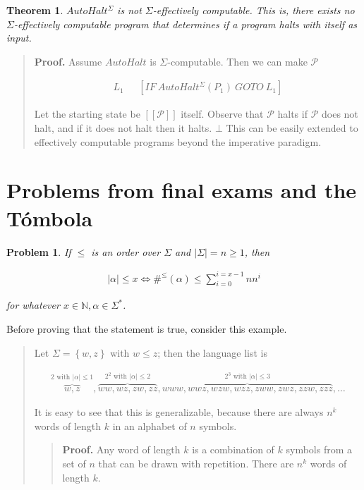 \documentclass[a4paper, 12pt]{article}
\newtheorem{problem}{Problem}
\newtheorem{theorem}{Theorem}
\newtheorem{problem}{Problem}
\newtheorem{theorem}{Theorem}
\begin{document}
\begin{theorem}
    $AutoHalt^{\Sigma}$ is not $\Sigma$-effectively computable. This is, there
    exists no $\Sigma$-effectively computable program that determines if a
    program halts with itself as input.
\end{theorem}


\small
\begin{quote}

    \textbf{Proof.} Assume $AutoHalt$ is $\Sigma$-computable. Then we can make
    $\mathcal{P}$

    \begin{align*}
        L_1 ~ ~ ~ & [IF ~ AutoHalt^{\Sigma}(P_1) ~ GOTO ~ L_1]
    \end{align*}

    Let the starting state be $[\![ \mathcal{P} ]\!]$ itself. Observe that
    $\mathcal{P}$ halts if $\mathcal{P}$ does not halt, and if it does not halt
    then it halts. $\bot$ This can be easily extended to effectively computable
    programs beyond the imperative paradigm.
\end{quote}
\normalsize

\pagebreak

\section{Problems from final exams and the Tómbola}

\begin{problem}
    If $\leq$ is an order over $\Sigma$ and $|\Sigma| = n \geq 1$, then 

    \begin{align*}
        |\alpha| \leq x \iff \#^{\leq}(\alpha) \leq \sum_{i=0}^{i = x - 1} n n^i
    \end{align*}

    for whatever $x \in \mathbb{N}, \alpha \in \Sigma^{*}$.
\end{problem}

Before proving that the statement is true, consider this example.


\small
\begin{quote}

Let $\Sigma = \left\{ w, z \right\} $ with $w \leq z$; then the
language list is 

\begin{align*}
    \overbrace{w, z}^{2 \text{ with }|\alpha| \leq 1}, \overbrace{ww, wz, zw,
        zz}^{2^2 \text{ with }|\alpha|
        \leq 2}, \overbrace{ www, wwz, wzw, wzz, zww, zwz, zzw, zzz }^{ 2^3
        \text{ with } |\alpha| \leq 3}, \ldots
\end{align*}

It is easy to see that this is generalizable, because there are always $n^k$
words of length $k$ in an alphabet of $n$ symbols. 

\small
\begin{quote}
    \textbf{Proof.} Any word of length $k$ is a combination of $k$ symbols from
    a set of $n$ that can be drawn with repetition. There are $n^k$ words of
    length $k$.
\end{quote}
\normalsize


\end{quote}
\normalsize
\end{document}
